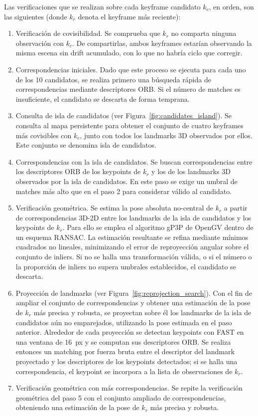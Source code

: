 Las verificaciones que se realizan sobre cada keyframe candidato $k_c$, en orden, son las siguientes (donde $k_r$ denota el keyframe más reciente):
\begin{enumerate}
    \item Verificación de covisibilidad. Se comprueba que $k_r$ no comparta ninguna observación con $k_c$. De compartirlas, ambos keyframes estarían observando la misma escena sin drift acumulado, con lo que no habría ciclo que corregir.
    \item Correspondencias iniciales. Dado que este proceso se ejecuta para cada uno de los 10 candidatos, se realiza primero una búsqueda rápida de correspondencias mediante descriptores ORB. Si el número de matches es insuficiente, el candidato se descarta de forma temprana.
    \item Consulta de isla de candidatos (ver Figura~\ref{fig:candidates_island}). Se consulta al mapa persistente para obtener el conjunto de cuatro keyframes más covisibles con $k_c$, junto con todos los landmarks 3D observados por ellos. Este conjunto se denomina isla de candidatos.
    \item Correspondencias con la isla de candidatos. Se buscan correspondencias entre los descriptores ORB de los keypoints de $k_r$ y los de los landmarks 3D observados por la isla de candidatos. En este paso se exige un umbral de matches más alto que en el paso 2 para considerar válido al candidato.
    \item Verificación geométrica. Se estima la pose absoluta no-central de $k_r$ a partir de correspondencias 3D-2D entre los landmarks de la isla de candidatos y los keypoints de $k_r$. Para ello se emplea el algoritmo gP3P de OpenGV dentro de un esquema RANSAC. La estimación resultante se refina mediante mínimos cuadrados no lineales, minimizando el error de reproyección angular sobre el conjunto de inliers. Si no se halla una transformación válida, o si el número o la proporción de inliers no supera umbrales establecidos, el candidato se descarta.
    \item Proyección de landmarks (ver Figura~\ref{fig:reprojection_search}). Con el fin de ampliar el conjunto de correspondencias y obtener una estimación de la pose de $k_r$ más precisa y robusta, se proyectan sobre él los landmarks de la isla de candidatos aún no emparejados, utilizando la pose estimada en el paso anterior. Alrededor de cada proyección se detectan keypoints con FAST en una ventana de 16~px y se computan sus descriptores ORB. Se realiza entonces un matching por fuerza bruta entre el descriptor del landmark proyectado y los descriptores de los keypoints detectados; si se halla una correspondencia, el keypoint se incorpora a la lista de observaciones de $k_r$.
    \item Verificación geométrica con más correspondencias. Se repite la verificación geométrica del paso 5 con el conjunto ampliado de correspondencias, obteniendo una estimación de la pose de $k_r$ más precisa y robusta.
\end{enumerate}

